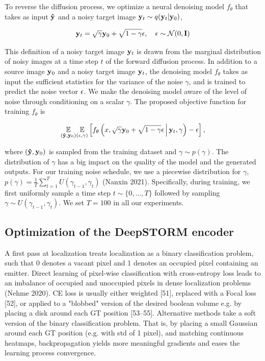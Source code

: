\documentclass{article}
\begin{document}
To reverse the diffusion process, we optimize a neural denoising model $f_{\theta}$ that takes as input $\bold{\hat{y}}$ and a noisy target image $\bold{y}_t \sim q(\bold{y}_t|\bold{y}_0)$,

\begin{equation}
\bold{y}_t = \sqrt{\gamma} \bold{y}_0 + \sqrt{1 - \gamma} \bold{\epsilon}, \quad \bold{\epsilon} \sim \mathcal{N}(0, \bold{I})
\end{equation}

This definition of a noisy target image $\bold{y}_t$ is drawn from the marginal distribution of noisy images at a time step $t$ of the forward diffusion process. In addition to a source image $\bold{y}_{0}$ and a noisy target image $\bold{y}_t$, the denoising model $f_{\theta}$ takes as input the sufficient statistics for the variance of the noise $\gamma$, and is trained to predict the noise vector $\bold{\epsilon}$. We make the denoising model aware of the level of noise through conditioning on a scalar $\gamma$. The proposed objective function for training $f_{\theta}$ is

\begin{equation}
\underset{(\bold{\hat{y}},\bold{y}_{0})}{\mathbb{E}}\underset{(\epsilon,\gamma)}{\mathbb{E}} \left[ f_{\theta}\left(x, \sqrt{\gamma} \bold{y}_0 + \sqrt{1 - \gamma} \epsilon \, \middle|\, \bold{y}_{t}, \gamma\right) - \epsilon \right],
\end{equation} 

where $(\bold{\hat{y}},\bold{y}_{0})$ is sampled from the training dataset and $\gamma \sim p(\gamma)$. The distribution of $\gamma$ has a big impact on the quality of the model and the generated outputs. For our training noise schedule, we use a piecewise distribution for $\gamma$, $p(\gamma) = \frac{1}{T}\sum_{t=1}^{T} U(\gamma_{t-1}, \gamma_t)$ (Nanxin 2021). Specifically, during training, we first uniformly sample a time step $t \sim \{0, ..., T\}$ followed by sampling $\gamma \sim U(\gamma_{t-1}, \gamma_t)$. We set $T = 100$ in all our experiments.

\subsection{Optimization of the DeepSTORM encoder}

A first pass at localization treats localization as a binary classification problem, such that 0 denotes a vacant pixel and 1 denotes an occupied pixel containing an emitter. Direct learning of pixel-wise classification with cross-entropy loss leads to an imbalance of occupied and unoccupied pixels in dense localization problems (Nehme 2020). CE loss is usually either weighted [51], replaced with a Focal loss [52], or applied to a "blobbed" version of the desired boolean volume e.g. by placing a disk around each GT position [53–55]. Alternative methods take a soft version of the binary classification problem. That is, by placing a small Gaussian around each GT position (e.g. with std of 1 pixel), and matching continuous heatmaps, backpropagation yields more meaningful gradients and eases the learning process convergence. 
\end{document}
